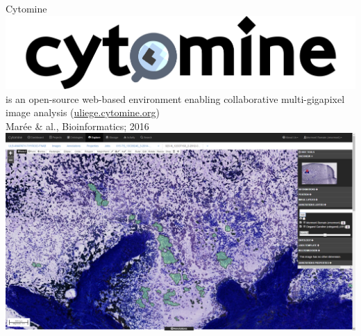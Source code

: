 \documentclass{beamer}
\begin{document}
\begin{frame}{Cytomine}
	\vspace*{-0.1in}
\center
	\includegraphics[scale=0.09]{images/cytomine_typo.png} is an open-source web-based environment enabling collaborative multi-gigapixel image analysis (\url{uliege.cytomine.org}) \\
	 \footnotesize{Marée \& al., Bioinformatics; 2016}\\
	\vspace*{0.02in}
	\hspace*{-1.5in}\includegraphics[scale=0.24]{images/cytomine.png}
\end{frame}
\end{document}

